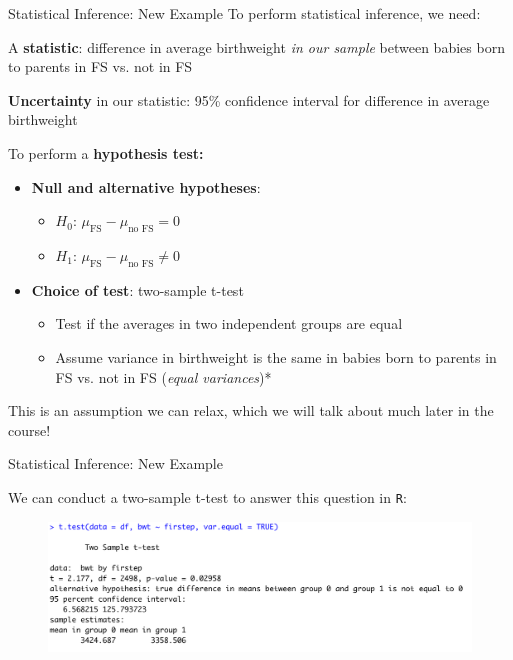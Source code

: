 \documentclass[10pt,t]{beamer}
\begin{document}
\begin{frame}{Statistical Inference: New Example}
To perform statistical inference, we need:

\vspace{0.3cm}

A \textbf{statistic}: difference in average birthweight \textit{in our sample} between babies born to parents in FS vs. not in FS 

\vspace{0.3cm}

\textbf{Uncertainty} in our statistic: 95\% confidence interval for difference in average birthweight

\vspace{0.3cm}

To perform a \textbf{hypothesis test:}

\begin{itemize}
	\item \textbf{Null and alternative hypotheses}:
	\begin{itemize}
		\item $H_0$: $\mu_{\text{FS}} - \mu_{\text{no FS}} = 0$
		\item $H_1$: $\mu_{\text{FS}} - \mu_{\text{no FS}} \neq 0$
	\end{itemize}
	\item \textbf{Choice of test}: two-sample t-test
	\begin{itemize}
		\item Test if the averages in two independent groups are equal
		\item Assume variance in birthweight is the same in babies born to parents in FS vs. not in FS (\textit{equal variances})*
	\end{itemize}
\end{itemize}

\small *This is an assumption we can relax, which we will talk about much later in the course!

\end{frame}

\begin{frame}{Statistical Inference: New Example}

We can conduct a two-sample t-test to answer this question in \texttt{R}:

\vspace{0.3cm}

\begin{figure}
\centering \includegraphics[scale=0.5]{ttest1.png}
\end{figure}

\end{frame}
\end{document}
